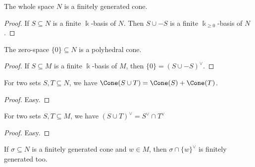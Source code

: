 \begin{proposition}
  \label{1-2-1-top-finitely-generated}
  The whole space \( N \) is a finitely generated cone.
\end{proposition}
\begin{proof}
  \uses{}
  \leanok
  If \( S \subseteq N \) is a finite \( \Bbbk \)-basis of \( N \).
  Then \( S \cup -S \) is a finite \( \Bbbk_{\geq 0} \)-basis of \( N
  \).
\end{proof}

\begin{proposition}
  \label{1-2-1-bot-polyhedral}
  The zero-space \( \{0\} \subseteq N \) is a polyhedral cone.
\end{proposition}
\begin{proof}
  \uses{}
  If \( S \subseteq M \) is a finite \( \Bbbk \)-basis of \( M \),
  then \( \{0\} = (S \cup -S)^\vee \).
\end{proof}

\begin{proposition}
  \label{1-2-1-span-union}
  For two sets \( S, T \subseteq N \), we have \( \Cone(S \cup T) =
  \Cone(S) + \Cone(T) \).
\end{proposition}
\begin{proof}
  Easy.
\end{proof}

\begin{proposition}
  \label{1-2-1-dual-union}
  \leanok
  For two sets \( S, T \subseteq M \), we have \( (S \cup T)^\vee =
  S^\vee \cap T^\vee \)
\end{proposition}

\begin{proof}
  \uses{}
  \leanok
  Easy.
\end{proof}

\begin{proposition}
  \label{1-2-1-fourier-motzkin-fg}
  If \( \sigma \subseteq N \) is a finitely generated cone and \( w
  \in M \), then \( \sigma \cap \{w\}^\vee \) is finitely generated too.
\end{proposition}

